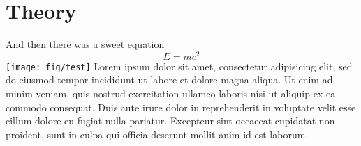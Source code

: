 
\chapter{Theory}
And then there was a sweet equation
\begin{equation}
E=mc^2
\end{equation}
\texttt{[image: fig/test]}
Lorem ipsum dolor sit amet, consectetur adipisicing elit, sed do eiusmod tempor
incididunt ut labore et dolore magna aliqua. Ut enim ad minim veniam, quis
nostrud exercitation ullamco laboris nisi ut aliquip ex ea commodo
consequat. Duis aute irure dolor in reprehenderit in voluptate velit esse cillum
dolore eu fugiat nulla pariatur. Excepteur sint occaecat cupidatat non proident,
sunt in culpa qui officia deserunt mollit anim id est laborum.
